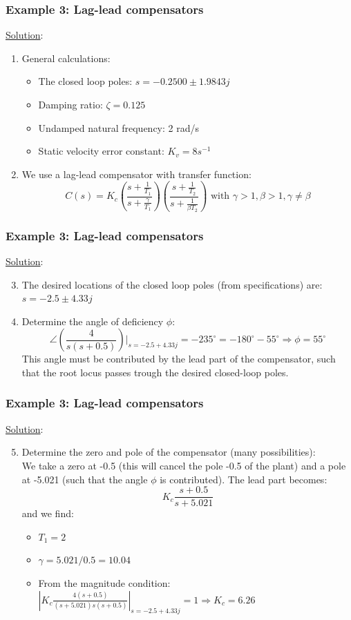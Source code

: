 \begin{frame}
	\frametitle{Example 3: Lag-lead compensators}
	\underline{Solution}:
	\begin{enumerate}
		\item General calculations:
		\begin{itemize}
			\item The closed loop poles: $s=-0.2500\pm1.9843j$
			\item Damping ratio: $\zeta=0.125$
			\item Undamped natural frequency: 2 rad/s
			\item Static velocity error constant: $K_v=8s^{-1}$
		\end{itemize}
	\item We use a lag-lead compensator with transfer function:
	$$C(s)=K_c(\frac{s+\frac{1}{T_1}}{s+\frac{\gamma}{T_1}})(\frac{s+\frac{1}{T_2}}{s+\frac{1}{\beta T_2}}) \text{ with } \gamma>1, \beta>1, \gamma\neq\beta$$
	\end{enumerate}
\end{frame}

\begin{frame}
	\frametitle{Example 3: Lag-lead compensators}
	\underline{Solution}:
	\begin{enumerate}
		\setcounter{enumi}{2}
		\item The desired locations of the closed loop poles (from specifications) are: $s=-2.5\pm4.33j$
		\item Determine the angle of deficiency $\phi$:
		$$\angle(\frac{4}{s(s+0.5)})|_{s=-2.5+4.33j}=-235^{\circ}=-180^{\circ}-55^{\circ} \Rightarrow \phi=55^{\circ}$$
		This angle must be contributed by the lead part of the compensator, such that the root locus passes trough the desired closed-loop poles. 
	\end{enumerate}
\end{frame}

\begin{frame}
	\frametitle{Example 3: Lag-lead compensators}
	\underline{Solution}:
	\begin{enumerate}
		\setcounter{enumi}{4}
		\item Determine the zero and pole of the compensator (many possibilities):\\
		We take a zero at -0.5 (this will cancel the pole -0.5 of the plant) and a pole at -5.021 (such that the angle $\phi$ is contributed).
		The lead part becomes:
		$$K_c\frac{s+0.5}{s+5.021}$$
		and we find:
		\begin{itemize}
			\item $T_1=2$
			\item $\gamma=5.021/0.5=10.04$
			\item From the magnitude condition: \\
			$|K_c\frac{4(s+0.5)}{(s+5.021)s(s+0.5)}|_{s=-2.5+4.33j}=1 \Rightarrow K_c=6.26$
		\end{itemize}
	\end{enumerate}
\end{frame}

